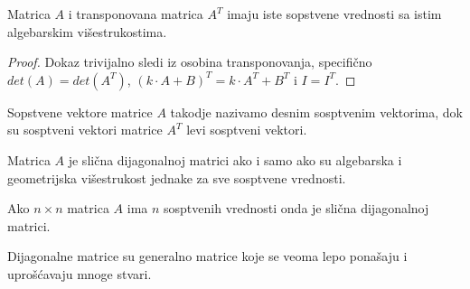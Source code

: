 \documentclass{article}
\begin{document}
\begin{theorem}
  Matrica $A$ i transponovana matrica $A^T$ imaju iste sopstvene vrednosti sa istim algebarskim višestrukostima.
\end{theorem}

\begin{proof}
  Dokaz trivijalno sledi iz osobina transponovanja, specifično $det(A) = det(A^T)$, $(k \cdot A + B)^T = k \cdot A^T + B^T$ i $I = I^T$.
\end{proof}

\begin{definition}
  Sopstvene vektore matrice $A$ takodje nazivamo desnim sosptvenim vektorima, dok su sosptveni vektori matrice $A^T$ levi sosptveni vektori.
\end{definition}

\begin{theorem}
  Matrica $A$ je slična dijagonalnoj matrici ako i samo ako su algebarska i geometrijska višestrukost jednake za sve sosptvene vrednosti.
\end{theorem}

\begin{corollary}
  Ako $n \times n$ matrica $A$ ima $n$ sosptvenih vrednosti onda je slična dijagonalnoj matrici.
\end{corollary}

Dijagonalne matrice su generalno matrice koje se veoma lepo ponašaju i uprošćavaju mnoge stvari.
\end{document}
